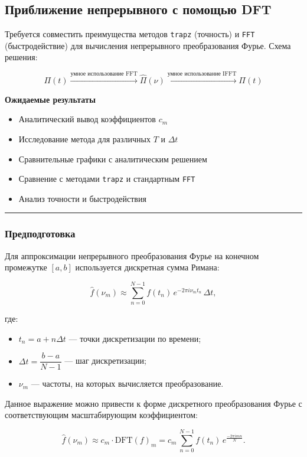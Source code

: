 \documentclass[a4paper,12pt]{article}
\begin{document}
\subsection{Приближение непрерывного с помощью DFT}

Требуется совместить преимущества методов \texttt{trapz} (точность) и \texttt{FFT} (быстродействие) для вычисления непрерывного преобразования Фурье. Схема решения:

\[
\Pi(t) \xrightarrow{\text{умное использование FFT}} \hat{\Pi}(\nu) \xrightarrow{\text{умное использование IFFT}} \Pi(t)
\]


\textbf{Ожидаемые результаты}

\begin{itemize}
	\item Аналитический вывод коэффициентов $c_m$
	\item Исследование метода для различных $T$ и $\Delta t$
	\item Сравнительные графики с аналитическим решением
	\item Сравнение с методами \texttt{trapz} и стандартным \texttt{FFT}
	\item Анализ точности и быстродействия
\end{itemize}

\hrule

\subsubsection{Предподготовка}

Для аппроксимации непрерывного преобразования Фурье на конечном промежутке $[a, b]$ используется дискретная сумма Римана:

\[
\hat{f}(\nu_m) \approx \sum_{n=0}^{N-1} f(t_n) \, e^{-2\pi i \nu_m t_n} \, \Delta t,
\]

где:
\begin{itemize}
	\item $t_n = a + n \Delta t$ — точки дискретизации по времени;
	\item $\Delta t = \dfrac{b - a}{N - 1}$ — шаг дискретизации;
	\item $\nu_m$ — частоты, на которых вычисляется преобразование.
\end{itemize}

Данное выражение можно привести к форме дискретного преобразования Фурье с соответствующим масштабирующим коэффициентом:

\[
\hat{f}(\nu_m) \approx c_m \cdot \mathrm{DFT}(f)_m = c_m \, \sum_{n=0}^{N-1} f(t_n) \, e^{\frac{-2\pi i m n}{N}}.
\]
\end{document}
